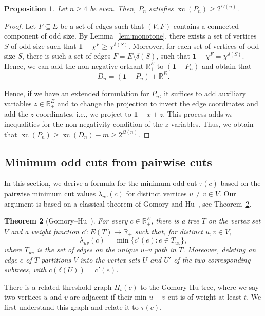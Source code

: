 \documentclass[centering,11pt,reqno]{amsart}
\newtheorem{theorem}{Theorem}[section]
\newtheorem{prop}[theorem]{Proposition}
\theoremstyle{definition}
\newcommand{\R}{\mathbb{R}}
\DeclareMathOperator{\xc}{xc}
\def\R{\mathbb{R}}
\begin{document}
\begin{prop}\label{prop:odd-ordinary-complexity}
    Let $n\ge4$ be even. Then, $P_n$ satisfies $\xc(P_n)\ge2^{\Omega(n)}$.
\end{prop}
\begin{proof}
    Let $F\subseteq E$ be a set of edges such that $(V,F)$ contains a connected component of odd size.
    By Lemma~\ref{lem:monotone}, there exists a set of vertices $S$ of odd size such that $\mathbf{1}-\chi^F\ge\chi^{\delta(S)}$. 
    Moreover, for each set of vertices of odd size $S$, there is such a set of edges $F=E\setminus\delta(S)$, such that $\mathbf{1}-\chi^F=\chi^{\delta(S)}$.
    Hence, we can add the non-negative orthant $\R_+^E$ to $(\mathbf{1}-P_n)$ and obtain that
    \[
        D_n=(\mathbf{1}-P_n)+\R_+^E.
    \]

    Hence, if we have an extended formulation for $P_n$, it suffices to add auxiliary variables $z\in\R_+^E$ and to change the projection to invert the edge coordinates and add the $z$-coordinates, i.e., we project to $\mathbf{1}-x+z$.
    This process adds $m$ inequalities for the non-negativity condition of the $z$-variables.
    Thus, we obtain that $\xc(P_n)\ge\xc(D_n)-m\ge2^{\Omega(n)}$.
\end{proof}

\subsection{Minimum odd cuts from pairwise cuts}
In this section, we derive a formula for the minimum odd cut $\tau(c)$ based on the pairwise minimum cut values $\lambda_{uv}(c)$ for distinct vertices $u\neq v\in V$.
Our argument is based on a classical theorem of Gomory and Hu~{\cite{GomoryHuTrees}}, see Theorem~\ref{thm:gomory-hu}.

\begin{theorem}[Gomory--Hu~{\cite{GomoryHuTrees}}]\label{thm:gomory-hu}
    For every $c\in\R_+^E$, there is a tree $T$ on the vertex set $V$ and a
    weight function $c':E(T)\to\R_+$ such that, for distinct $u,v\in V$,
    \[
        \lambda_{uv}(c)=\min\{c'(e):e\in T_{uv}\},
    \]
    where $T_{uv}$ is the set of edges on the unique $u$--$v$ path in $T$.
    Moreover, deleting an edge $e$ of $T$ partitions $V$ into the vertex sets $U$ and $U'$ of the two corresponding subtrees, with $c(\delta(U))=c'(e)$.
\end{theorem}



There is a related threshold graph $H_{t}(c)$ to the Gomory-Hu tree, where we say two vertices $u$ and $v$ are adjacent if their min $u-v$ cut is of weight at least $t$. We first understand this graph and relate it to $\tau(c)$. 
\end{document}
